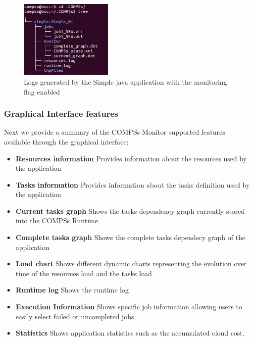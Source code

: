 \begin{figure}[ht!]
  \centering
    \includegraphics[width=0.4\textwidth]{./Sections/4_Tools/Figures/logs_with_monitor.jpeg}
    \caption{Logs generated by the Simple java application with the monitoring flag enabled}
    \label{fig:simple_logs_monitor}
\end{figure}

\newpage
\subsubsection{Graphical Interface features}
Next we provide a summary of the COMPSs Monitor supported features available through the graphical interface:
\begin{itemize}
 \item \textbf{Resources information} \newline
	Provides information about the resources used by the application
 \item \textbf{Tasks information} \newline
	Provides information about the tasks definition used by the application
 \item \textbf{Current tasks graph} \newline
	Shows the tasks dependency graph currently stored into the COMPSs Runtime
 \item \textbf{Complete tasks graph} \newline
	Shows the complete tasks dependecy graph of the application
 \item \textbf{Load chart} \newline
	Shows different dynamic charts representing the evolution over time of the resources load and the tasks load
 \item \textbf{Runtime log} \newline
	Shows the runtime log
 \item \textbf{Execution Information} \newline
	Shows specific job information allowing users to easily select failed or uncompleted jobs
 \item \textbf{Statistics} \newline
	Shows application statistics such as the accumulated cloud cost. 
\end{itemize}

